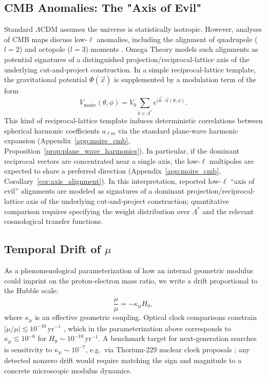 \subsection{CMB Anomalies: The "Axis of Evil"}
Standard $\Lambda$CDM assumes the universe is statistically isotropic. However, analyses of CMB maps discuss low-$\ell$ anomalies, including the alignment of quadrupole ($l=2$) and octopole ($l=3$) moments \cite{Copi2010LargeAngle,Planck2018Isotropy}.
Omega Theory models such alignments as potential signatures of a distinguished projection/reciprocal-lattice axis of the underlying cut-and-project construction. In a simple reciprocal-lattice template, the gravitational potential $\Phi(\vec{x})$ is supplemented by a modulation term of the form
\begin{equation}
    V_{\text{moire}}(\theta, \phi) = V_0 \sum_{k \in \Lambda^*} e^{i \vec{k} \cdot \vec{n}(\theta, \phi)}.
\end{equation}
This kind of reciprocal-lattice template induces deterministic correlations between spherical harmonic coefficients $a_{\ell m}$ via the standard plane-wave harmonic expansion (Appendix~\ref{app:moire_cmb}, Proposition~\ref{prop:plane_wave_harmonics}). In particular, if the dominant reciprocal vectors are concentrated near a single axis, the low-$\ell$ multipoles are expected to share a preferred direction (Appendix~\ref{app:moire_cmb}, Corollary~\ref{cor:axis_alignment}). In this interpretation, reported low-$\ell$ ``axis of evil'' alignments are modeled as signatures of a dominant projection/reciprocal-lattice axis of the underlying cut-and-project construction; quantitative comparison requires specifying the weight distribution over $\Lambda^*$ and the relevant cosmological transfer functions.

\subsection{Temporal Drift of \texorpdfstring{$\mu$}{mu}}
As a phenomenological parameterization of how an internal geometric modulus could imprint on the proton-electron mass ratio, we write a drift proportional to the Hubble scale:
\begin{equation}
    \frac{\dot{\mu}}{\mu} = - \kappa_{\mu} H_0,
\end{equation}
where $\kappa_{\mu}$ is an effective geometric coupling. Optical clock comparisons constrain $|\dot{\mu}/\mu|\lesssim 10^{-16}\,\mathrm{yr}^{-1}$ \cite{Godun2014YbRatios}, which in the parameterization above corresponds to $\kappa_{\mu}\lesssim 10^{-6}$ for $H_0\sim 10^{-10}\,\mathrm{yr}^{-1}$. A benchmark target for next-generation searches is sensitivity to $\kappa_{\mu}\sim 10^{-7}$, e.g.\ via Thorium-229 nuclear clock proposals \cite{PeikTamm2003}; any detected nonzero drift would require matching the sign and magnitude to a concrete microscopic modulus dynamics.

